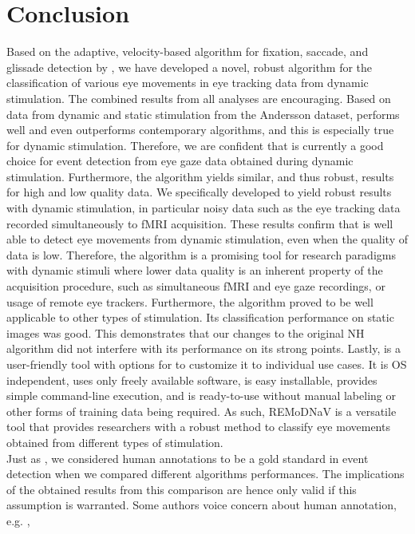 \section*{Conclusion}\label{con}
Based on the adaptive, velocity-based algorithm for fixation, saccade, and
glissade detection by \cite{Nystrom2010AnData}, we have developed a novel,
robust algorithm for the classification of various eye movements in eye tracking
data from dynamic stimulation.
The combined results from all analyses are encouraging. Based on data from dynamic and static stimulation from the
Andersson dataset, \remodnav performs well and even outperforms contemporary algorithms, and this is especially true
for dynamic stimulation. Therefore, we are confident
that \remodnav is currently a good choice for event detection from eye gaze data obtained during dynamic stimulation.
Furthermore, the algorithm yields similar, and thus robust, results for high and low quality data. We specifically
developed \remodnav to yield robust results with dynamic stimulation, in particular noisy data such as the eye
tracking data recorded simultaneously to fMRI acquisition. These results confirm that \remodnav is well able to detect
eye movements from dynamic stimulation, even when the quality of data is low. Therefore, the algorithm is a promising
tool for research paradigms with dynamic stimuli where lower data quality is an inherent property of the acquisition
procedure, such as simultaneous fMRI and eye gaze recordings, or usage of remote eye trackers.
Furthermore, the algorithm proved to be well applicable to other types of stimulation. Its classification
performance on static images was good. This demonstrates that our changes to the original NH algorithm did not
interfere with its performance on its strong points. Lastly, \remodnav is a user-friendly tool with options for
to customize it to individual use cases. It is OS independent, uses only freely available software, is easy
installable, provides simple command-line execution, and is ready-to-use without manual labeling or other forms
of training data being required. As such, REMoDNaV is a versatile tool that provides researchers with a robust
method to classify eye movements obtained from different types of stimulation. \\
Just as \cite{Andersson2017}, we considered human annotations to be a gold standard in event detection when we
compared different algorithms performances. The implications of the obtained results from this comparison are hence
only valid if this assumption is warranted. Some authors voice concern about human annotation, e.g. \cite{5523936},
